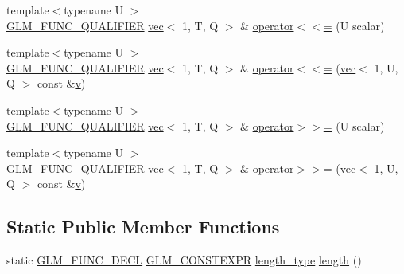 \begin{DoxyCompactItemize}
\item 
{\footnotesize template$<$typename U $>$ }\\\mbox{\hyperlink{setup_8hpp_a33fdea6f91c5f834105f7415e2a64407}{G\+L\+M\+\_\+\+F\+U\+N\+C\+\_\+\+Q\+U\+A\+L\+I\+F\+I\+ER}} \mbox{\hyperlink{structglm_1_1vec}{vec}}$<$ 1, T, Q $>$ \& \mbox{\hyperlink{structglm_1_1vec_3_011_00_01_t_00_01_q_01_4_a4424082249c3a13912bb00816f8a3a56}{operator$<$$<$=}} (U scalar)
\item 
{\footnotesize template$<$typename U $>$ }\\\mbox{\hyperlink{setup_8hpp_a33fdea6f91c5f834105f7415e2a64407}{G\+L\+M\+\_\+\+F\+U\+N\+C\+\_\+\+Q\+U\+A\+L\+I\+F\+I\+ER}} \mbox{\hyperlink{structglm_1_1vec}{vec}}$<$ 1, T, Q $>$ \& \mbox{\hyperlink{structglm_1_1vec_3_011_00_01_t_00_01_q_01_4_a129ec8874e812e787c380255b92468fa}{operator$<$$<$=}} (\mbox{\hyperlink{structglm_1_1vec}{vec}}$<$ 1, U, Q $>$ const \&\mbox{\hyperlink{_s_d_l__opengl_8h_a10a82eabcb59d2fcd74acee063775f90}{v}})
\item 
{\footnotesize template$<$typename U $>$ }\\\mbox{\hyperlink{setup_8hpp_a33fdea6f91c5f834105f7415e2a64407}{G\+L\+M\+\_\+\+F\+U\+N\+C\+\_\+\+Q\+U\+A\+L\+I\+F\+I\+ER}} \mbox{\hyperlink{structglm_1_1vec}{vec}}$<$ 1, T, Q $>$ \& \mbox{\hyperlink{structglm_1_1vec_3_011_00_01_t_00_01_q_01_4_afe1c0569bc10df48602abfda91892c98}{operator$>$$>$=}} (U scalar)
\item 
{\footnotesize template$<$typename U $>$ }\\\mbox{\hyperlink{setup_8hpp_a33fdea6f91c5f834105f7415e2a64407}{G\+L\+M\+\_\+\+F\+U\+N\+C\+\_\+\+Q\+U\+A\+L\+I\+F\+I\+ER}} \mbox{\hyperlink{structglm_1_1vec}{vec}}$<$ 1, T, Q $>$ \& \mbox{\hyperlink{structglm_1_1vec_3_011_00_01_t_00_01_q_01_4_a5f338e27a69533420079adc1daaab092}{operator$>$$>$=}} (\mbox{\hyperlink{structglm_1_1vec}{vec}}$<$ 1, U, Q $>$ const \&\mbox{\hyperlink{_s_d_l__opengl_8h_a10a82eabcb59d2fcd74acee063775f90}{v}})
\end{DoxyCompactItemize}
\subsection*{Static Public Member Functions}
\begin{DoxyCompactItemize}
\item 
static \mbox{\hyperlink{setup_8hpp_ab2d052de21a70539923e9bcbf6e83a51}{G\+L\+M\+\_\+\+F\+U\+N\+C\+\_\+\+D\+E\+CL}} \mbox{\hyperlink{setup_8hpp_a08b807947b47031d3a511f03f89645ad}{G\+L\+M\+\_\+\+C\+O\+N\+S\+T\+E\+X\+PR}} \mbox{\hyperlink{structglm_1_1vec_3_011_00_01_t_00_01_q_01_4_a37415eee3b59cf93cdb752a2b30fe5e6}{length\+\_\+type}} \mbox{\hyperlink{structglm_1_1vec_3_011_00_01_t_00_01_q_01_4_a225b4ffa0391c3f0c64d1b43cf7a662d}{length}} ()
\end{DoxyCompactItemize}
